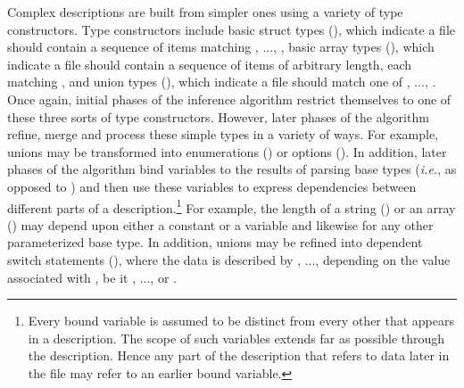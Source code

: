 Complex descriptions are built from simpler ones using a variety of
type constructors.  Type constructors include
basic struct types (), which indicate a file 
should contain a sequence of items matching , ..., ,
basic array types (), which indicate a file should contain
a sequence of items of arbitrary length, each matching ,
and union types (), which indicate a file
should match one of , ..., .  Once again, initial phases
of the inference algorithm restrict themselves to one of these three
sorts of type constructors.  However, later phases of the algorithm
refine, merge and process these simple types in a variety of ways.
For example, unions may be transformed into 
enumerations () or options ().  In
addition, later phases of the algorithm 
bind variables to the results of parsing 
base types ({\em i.e.}, 
 as opposed to )
and then use these variables to express dependencies between different parts
of a description.\footnote{Every bound variable is assumed to be distinct
from every other that appears in a description.  The scope of such variables
extends far as possible through the description.  Hence any part of the 
description that refers to data later in the file may refer to an earlier
bound variable.}  For example, the length of a string ()
or an array () may depend upon either a constant or
a variable and likewise for any other parameterized base type.  In
addition, unions may be refined into dependent switch statements
(), where the
data is described by , ...,  depending on the value
associated with , be it , ..., or .


